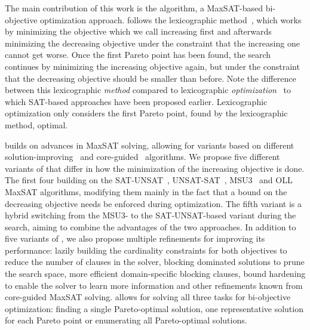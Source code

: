 The main contribution of this work is the \algname{} algorithm, a MaxSAT-based bi-objective optimization approach.
\algname{} follows the lexicographic method~\autocite{survey}, which works by minimizing the objective which we call increasing first and afterwards minimizing the decreasing objective under the constraint that the increasing one cannot get worse.
Once the first Pareto point has been found, the search continues by minimizing the increasing objective again, but under the constraint that the decreasing objective should be smaller than before.
Note the difference between this lexicographic \emph{method} compared to lexicographic \emph{optimization}~\autocite{DBLP:conf/ijcai/ArgelichLS09,DBLP:journals/amai/Marques-SilvaAGL11} to which SAT-based approaches have been proposed earlier.
Lexicographic optimization only considers the first Pareto point, found by the lexicographic method, optimal.

\algname{} builds on advances in MaxSAT solving, allowing for variants based on different solution-improving~\autocites{handbook2-maxsat,DBLP:journals/jsat/BerreP10,DBLP:journals/jsat/EenS06} and core-guided~\autocites{DBLP:journals/corr/abs-0712-1097,DBLP:conf/sat/AnsoteguiBL09,DBLP:conf/cp/MorgadoDM14,DBLP:journals/jsat/IgnatievMM19} algorithms.
We propose five different variants of \algname{} that differ in how the minimization of the increasing objective is done.
The first four building on the SAT-UNSAT~\autocite{DBLP:journals/jsat/BerreP10}, UNSAT-SAT~\autocite{DBLP:conf/sat/FuM06}, MSU3~\autocite{DBLP:journals/corr/abs-0712-1097} and OLL~\autocite{DBLP:conf/cp/MorgadoDM14} MaxSAT algorithms, modifying them mainly in the fact that a bound on the decreasing objective needs be enforced during optimization.
The fifth variant is a hybrid switching from the MSU3- to the SAT-UNSAT-based variant during the search, aiming to combine the advantages of the two approaches.
In addition to five variants of \algname{}, we also propose multiple refinements for improving its performance:
lazily building the cardinality constraints for both objectives to reduce the number of clauses in the solver, blocking dominated solutions to prune the search space, more efficient domain-specific blocking clauses, bound hardening to enable the solver to learn more information and other refinements known from core-guided MaxSAT solving.
\algname{} allows for solving all three tasks for bi-objective optimization:
finding a single Pareto-optimal solution, one representative solution for each Pareto point or enumerating all Pareto-optimal solutions.

